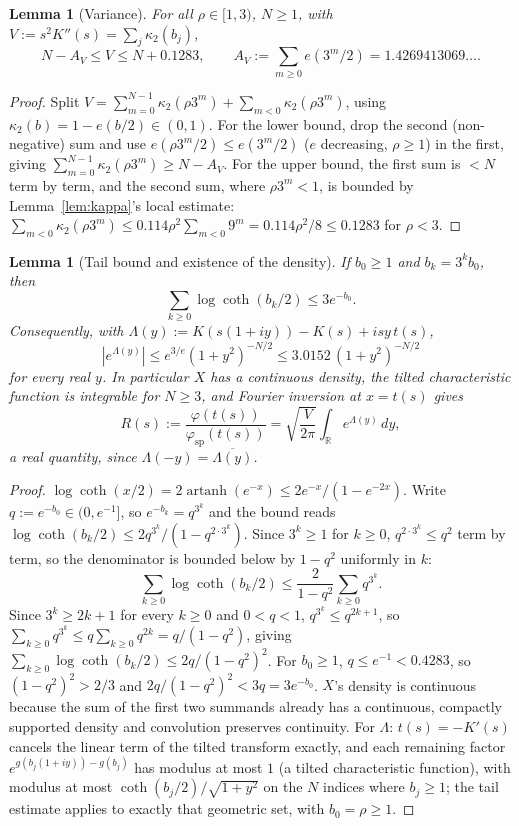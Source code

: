 \documentclass[11pt]{article}
\newtheorem{lemma}[theorem]{Lemma}
\theoremstyle{definition}
\theoremstyle{remark}
\DeclareMathOperator{\artanh}{artanh}
\newcommand{\R}{\mathbb{R}}
\begin{document}
\begin{lemma}[Variance]
\label{lem:variance}
For all $\rho\in[1,3)$, $N\ge1$, with $V := s^2K''(s) = \sum_j\kappa_2(b_j)$,
\[
N - A_V \le V \le N + 0.1283, \qquad A_V := \sum_{m\ge0} e(3^m/2) = 1.4269413069\ldots.
\]
\end{lemma}

\begin{proof}
Split $V = \sum_{m=0}^{N-1}\kappa_2(\rho3^m) + \sum_{m<0}\kappa_2(\rho3^m)$, using $\kappa_2(b) =
1-e(b/2) \in (0,1)$. For the lower bound, drop the second (non-negative) sum and use $e(\rho3^m/2)
\le e(3^m/2)$ ($e$ decreasing, $\rho\ge1$) in the first, giving $\sum_{m=0}^{N-1}\kappa_2(\rho3^m)
\ge N - A_V$. For the upper bound, the first sum is $<N$ term by term, and the second sum, where
$\rho3^m<1$, is bounded by Lemma~\ref{lem:kappa}'s local estimate: $\sum_{m<0}\kappa_2(\rho3^m) \le
0.114\rho^2\sum_{m<0}9^m = 0.114\rho^2/8 \le 0.1283$ for $\rho<3$.
\end{proof}

\begin{lemma}[Tail bound and existence of the density]
\label{lem:tail}
If $b_0\ge1$ and $b_k=3^kb_0$, then
\[
\sum_{k\ge0}\log\coth(b_k/2) \le 3e^{-b_0}.
\]
Consequently, with $\Lambda(y) := K(s(1+iy)) - K(s) + isy\,t(s)$,
\[
|e^{\Lambda(y)}| \le e^{3/e}(1+y^2)^{-N/2} \le 3.0152\,(1+y^2)^{-N/2}
\]
for every real $y$. In particular $X$ has a continuous density, the tilted characteristic function
is integrable for $N\ge3$, and Fourier inversion at $x=t(s)$ gives
\begin{equation}
\label{eq:R}
R(s) := \frac{\varphi(t(s))}{\varphi_{\mathrm{sp}}(t(s))} = \sqrt{\frac{V}{2\pi}}\int_\R e^{\Lambda(y)}\,dy,
\end{equation}
a real quantity, since $\Lambda(-y) = \overline{\Lambda(y)}$.
\end{lemma}

\begin{proof}
$\log\coth(x/2) = 2\artanh(e^{-x}) \le 2e^{-x}/(1-e^{-2x})$. Write $q:=e^{-b_0}\in(0,e^{-1}]$, so
$e^{-b_k}=q^{3^k}$ and the bound reads $\log\coth(b_k/2) \le 2q^{3^k}/(1-q^{2\cdot3^k})$. Since
$3^k\ge1$ for $k\ge0$, $q^{2\cdot3^k}\le q^2$ term by term, so the denominator is bounded below by
$1-q^2$ uniformly in $k$:
\[
\sum_{k\ge0}\log\coth(b_k/2) \le \frac{2}{1-q^2}\sum_{k\ge0}q^{3^k}.
\]
Since $3^k\ge2k+1$ for every $k\ge0$ and $0<q<1$, $q^{3^k}\le q^{2k+1}$, so
$\sum_{k\ge0}q^{3^k} \le q\sum_{k\ge0}q^{2k} = q/(1-q^2)$, giving
$\sum_{k\ge0}\log\coth(b_k/2) \le 2q/(1-q^2)^2$. For $b_0\ge1$, $q\le e^{-1}<0.4283$, so
$(1-q^2)^2>2/3$ and $2q/(1-q^2)^2<3q=3e^{-b_0}$.
$X$'s density is continuous because the sum of the first two summands already has a continuous,
compactly supported density and convolution preserves continuity. For $\Lambda$: $t(s) =
-K'(s)$ cancels the linear term of the tilted transform exactly, and each remaining factor
$e^{g(b_j(1+iy))-g(b_j)}$ has modulus at most $1$ (a tilted characteristic function), with modulus
at most $\coth(b_j/2)/\sqrt{1+y^2}$ on the $N$ indices where $b_j\ge1$; the tail estimate applies to
exactly that geometric set, with $b_0=\rho\ge1$.
\end{proof}
\end{document}
